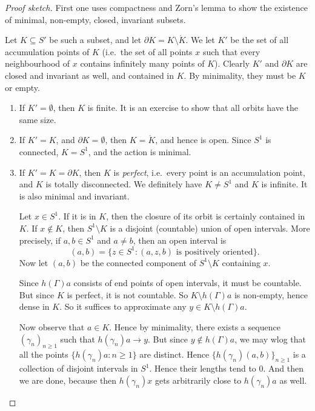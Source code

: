 \documentclass[a4paper]{article}
\begin{document}
\begin{proof}[Proof sketch]
  First one uses compactness and Zorn's lemma to show the existence of minimal, non-empty, closed, invariant subsets.

  Let $K \subseteq S'$ be such a subset, and let $\partial K = K \setminus \mathring{K}$. We let $K'$ be the set of all accumulation points of $K$ (i.e.\ the set of all points $x$ such that every neighbourhood of $x$ contains infinitely many points of $K$). Clearly $K'$ and $\partial K$ are closed and invariant as well, and contained in $K$. By minimality, they must be $K$ or empty.

  \begin{enumerate}
    \item If $K' = \emptyset$, then $K$ is finite. It is an exercise to show that all orbits have the same size.
    \item If $K' = K$, and $\partial K = \emptyset$, then $K = \mathring{K}$, and hence is open. Since $S^1$ is connected, $K = S^1$, and the action is minimal.
    \item If $K' = K = \partial K$, then $K$ is \emph{perfect}, i.e.\ every point is an accumulation point, and $K$ is totally disconnected. We definitely have $K \not= S^1$ and $K$ is infinite. It is also minimal and invariant.

      Let $x \in S^1$. If it is in $K$, then the closure of its orbit is certainly contained in $K$. If $x \not\in K$, then $S^1 \setminus K$ is a disjoint (countable) union of open intervals. More precisely, if $a, b \in S^1$ and $a \not= b$, then an open interval is
      \[
        (a, b) = \{z \in S^1: (a, z, b)\text{ is positively oriented}\}.
      \]
      Now let $(a, b)$ be the connected component of $S^1 \setminus K$ containing $x$.

      Since $h(\Gamma)a$ consists of end points of open intervals, it must be countable. But since $K$ is perfect, it is not countable. So $K \setminus h(\Gamma) a$ is non-empty, hence dense in $K$. So it suffices to approximate any $y \in K \setminus h(\Gamma) a$.

      Now observe that $a \in K$. Hence by minimality, there exists a sequence $(\gamma_n)_{n \geq 1}$ such that $h(\gamma_n) a \to y$. But since $y \not \in h(\Gamma) a$, we may wlog that all the points $\{h(\gamma_n)a : n \geq 1\}$ are distinct. Hence $\{h(\gamma_n)(a, b) \}_{n \geq 1}$ is a collection of disjoint intervals in $S^1$. Hence their lengths tend to $0$. And then we are done, because then $h(\gamma_n) x$ gets arbitrarily close to $h(\gamma_n) a$ as well.
  \end{enumerate}
\end{proof}
\end{document}
